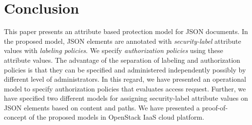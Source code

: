 \section{Conclusion}
\label {sec:conclusion}

This paper presents an attribute based protection model for JSON documents. In the proposed model, JSON elements are annotated with \textit{security-label} attribute values with \textit{labeling policies}. We specify \textit{authorization policies} using these attribute values. The advantage of the separation of labeling and authorization policies is that they can be specified and administered independently possibly by different level of administrators. In this regard, we have presented an operational model to specify authorization policies that evaluates access  request. Further, we have  specified two different models for assigning security-label attribute values on JSON elements based on content and paths. We have presented a proof-of-concept of the proposed models in OpenStack IaaS cloud platform.

